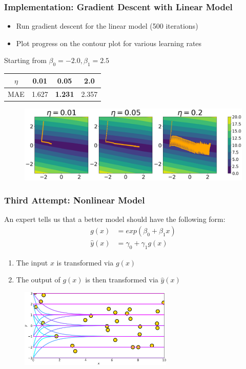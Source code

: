 \documentclass{beamer}
\begin{document}
\begin{frame}
\frametitle{Implementation: Gradient Descent with Linear Model}

\begin{itemize}
\item Run gradient descent for the linear model (500 iterations)
\item Plot progress on the contour plot for various learning rates
\end{itemize}

\centering
Starting from $\beta_0 = -2.0, \beta_1 = 2.5$

\begin{tabular}{|c|c|c|c|}
\hline 
$\eta$ & 0.01 & \textbf{0.05} & 2.0\tabularnewline
\hline 
\hline 
MAE & 1.627 & \textbf{1.231} & 2.357\tabularnewline
\hline 
\end{tabular}


\begin{figure}
\includegraphics[width=\textwidth]{../figures/linear_gd_steps.png}
\end{figure}


\end{frame}

\begin{frame}
\frametitle{Third Attempt: Nonlinear Model}

An expert tells us that a better model should have the following form:
\begin{align*}
g(x) & =exp(\beta_{0}+\beta_{1}x)\\
\hat{y}(x) & =\gamma_{0}+\gamma_{1}g(x)
\end{align*}

\begin{enumerate}
\item The input $x$ is  transformed via $g(x)$
\item The output of $g(x)$ is then transformed via $\hat{y}(x)$
\end{enumerate}

\begin{figure}
\includegraphics[width=0.65\textwidth]{../figures/nonlinear_priors.png}
\end{figure}

\end{frame}
\end{document}
